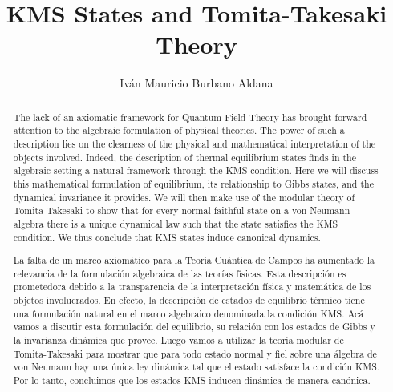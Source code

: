 \documentclass{article}
\title{KMS States and Tomita-Takesaki Theory}
\author{Iván Mauricio Burbano Aldana}
\begin{document}
\maketitle

\begin{abstract}

The lack of an axiomatic framework for Quantum Field Theory has brought forward attention to the algebraic formulation of physical theories. The  power of such a description lies on the clearness of the physical and mathematical interpretation of the objects involved. Indeed, the description of thermal equilibrium states finds in the algebraic setting a natural framework through the KMS condition. Here we will discuss this mathematical formulation of equilibrium, its relationship to Gibbs states, and the dynamical invariance it provides. We will then make use of the modular theory of Tomita-Takesaki to show that for every normal faithful state on a von Neumann algebra there is a unique dynamical law such that the state satisfies the KMS condition. We thus conclude that KMS states induce canonical dynamics.

\end{abstract}

\begin{otherlanguage}{spanish}

\begin{abstract}

La falta de un marco axiomático para la Teoría Cuántica de Campos ha aumentado la relevancia de la formulación algebraica de las teorías físicas. Esta descripción es prometedora debido a la transparencia de la interpretación física y matemática de los objetos involucrados. En efecto, la descripción de estados de equilibrio térmico tiene una formulación natural en el marco algebraico denominada la condición KMS. Acá vamos a discutir esta formulación del equilibrio, su relación con los estados de Gibbs y la invarianza dinámica que provee. Luego vamos a utilizar la teoría modular de Tomita-Takesaki para mostrar que para todo estado normal y fiel sobre una álgebra de von Neumann hay una única ley dinámica tal que el estado satisface la condición KMS. Por lo tanto, concluimos que los estados KMS inducen dinámica de manera canónica. 

\end{abstract}

\end{otherlanguage}

\nocite{*}



\end{document}
